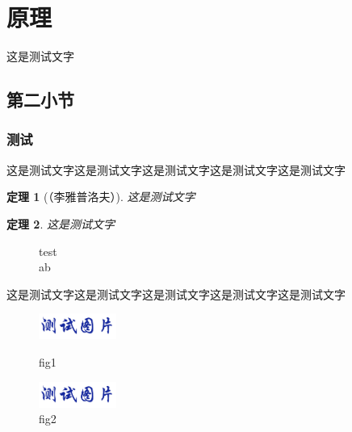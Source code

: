 \documentclass[UTF8,zihao=-4,twoside]{ctexart}
\theoremstyle{thmstyle}
\newtheorem{dingli}{定理}[section]
\newcommand{\sect}[1]{\vfill\clearpage\setcounter{figure}{0}\setcounter{table}{0}\setcounter{equation}{0}\section{#1}}
\newcommand{\figstyle}{\centering\vspace{-0.1cm}\setlength{\abovecaptionskip}{0.2cm}\setlength{\belowcaptionskip}{-0.5cm}}
\begin{document}
    \sect{原理}
    这是测试文字
        \subsection{第二小节}
        \subsubsection{测试}
        这是测试文字这是测试文字这是测试文字这是测试文字这是测试文字
        \begin{dingli}[（李雅普洛夫）]
          这是测试文字
        \end{dingli}

        \begin{dingli}
          这是测试文字
        \end{dingli}

            \begin{figure}[H]
                \figstyle
                \caption{test\protect\\ ab}
            \end{figure}

        这是测试文字这是测试文字这是测试文字这是测试文字这是测试文字
            \begin{figure}[H]
                \figstyle
                \begin{minipage}[t]{0.3\textwidth}
                    \centering
            	    \includegraphics [width=1in]{figures/test.png}
                    \caption{fig1}
                \end{minipage}
                \begin{minipage}[t]{0.3\textwidth}
                    \centering
            	    \includegraphics [width=1in]{figures/test.png}
                    \caption{fig2}
                \end{minipage}
            \end{figure}
\end{document}
